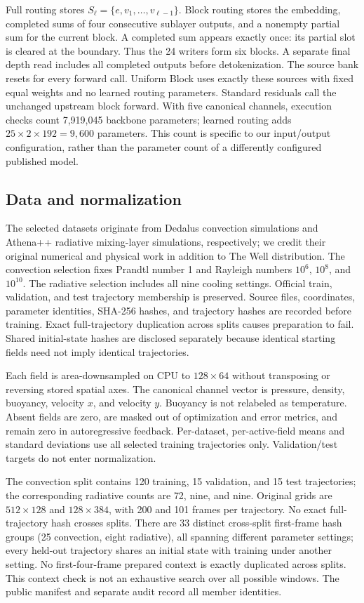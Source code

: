 Full routing stores $S_\ell=\{e,v_1,\ldots,v_{\ell-1}\}$. Block routing stores the embedding, completed sums of four consecutive sublayer outputs, and a nonempty partial sum for the current block. A completed sum appears exactly once: its partial slot is cleared at the boundary. Thus the 24 writers form six blocks. A separate final depth read includes all completed outputs before detokenization. The source bank resets for every forward call. Uniform Block uses exactly these sources with fixed equal weights and no learned routing parameters. Standard residuals call the unchanged upstream block forward. With five canonical channels, execution checks count 7,919,045 backbone parameters; learned routing adds $25\times2\times192=9,600$ parameters. This count is specific to our input/output configuration, rather than the parameter count of a differently configured published model.

\subsection{Data and normalization}
The selected datasets originate from Dedalus convection simulations and Athena++ radiative mixing-layer simulations, respectively; we credit their original numerical and physical work\cite{dedalus,fielding} in addition to The Well distribution\cite{well}.
The convection selection fixes Prandtl number 1 and Rayleigh numbers $10^6$, $10^8$, and $10^{10}$. The radiative selection includes all nine cooling settings. Official train, validation, and test trajectory membership is preserved. Source files, coordinates, parameter identities, SHA-256 hashes, and trajectory hashes are recorded before training. Exact full-trajectory duplication across splits causes preparation to fail. Shared initial-state hashes are disclosed separately because identical starting fields need not imply identical trajectories.

Each field is area-downsampled on CPU to $128\times64$ without transposing or reversing stored spatial axes. The canonical channel vector is pressure, density, buoyancy, velocity $x$, and velocity $y$. Buoyancy is not relabeled as temperature. Absent fields are zero, are masked out of optimization and error metrics, and remain zero in autoregressive feedback. Per-dataset, per-active-field means and standard deviations use all selected training trajectories only. Validation/test targets do not enter normalization.

The convection split contains 120 training, 15 validation, and 15 test trajectories; the corresponding radiative counts are 72, nine, and nine. Original grids are $512\times128$ and $128\times384$, with 200 and 101 frames per trajectory. No exact full-trajectory hash crosses splits. There are 33 distinct cross-split first-frame hash groups (25 convection, eight radiative), all spanning different parameter settings; every held-out trajectory shares an initial state with training under another setting. No first-four-frame prepared context is exactly duplicated across splits. This context check is not an exhaustive search over all possible windows. The public manifest and separate audit record all member identities\cite{studycode}.

